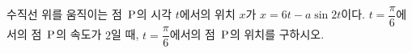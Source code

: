 수직선 위를 움직이는 점~$\mathrm{P}$의 시각 $t$에서의 위치 $x$가 $x=6t-a\sin 2t$이다. $t=\dfrac{\pi}{6}$에서의 점~$\mathrm{P}$의 속도가 $2$일 때, $t=\dfrac{\pi}{6}$에서의 점~$\mathrm{P}$의 위치를 구하시오. 
